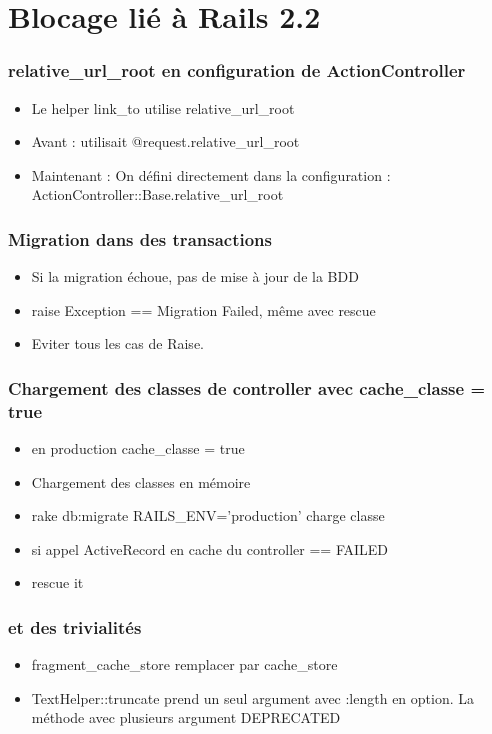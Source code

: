 \documentclass{beamer}
\begin{document}
\section{Blocage lié à Rails 2.2}

\begin{frame}
  \frametitle{relative\_url\_root en configuration de ActionController}
  \begin{itemize}
    \item Le helper link\_to utilise relative\_url\_root
    \item Avant : utilisait @request.relative\_url\_root
    \item Maintenant : On défini directement dans la configuration :
    ActionController::Base.relative\_url\_root
  \end{itemize}
\end{frame}

\begin{frame}
    \frametitle{Migration dans des transactions}
    \begin{itemize}
        \item Si la migration échoue, pas de mise à jour de la BDD
        \item raise Exception == Migration Failed, même avec rescue
        \item Eviter tous les cas de Raise.
    \end{itemize}
\end{frame}

\begin{frame}
    \frametitle{Chargement des classes de controller avec cache\_classe = true}
    \begin{itemize}
        \item en production cache\_classe = true
        \item Chargement des classes en mémoire
        \item rake db:migrate RAILS\_ENV='production' charge classe 
        \item si appel ActiveRecord en cache du controller == FAILED
        \item rescue it
    \end{itemize}
\end{frame}

\begin{frame}
  \frametitle{et des trivialités}
  \begin{itemize}
    \item fragment\_cache\_store remplacer par cache\_store
    \item TextHelper::truncate prend un seul argument avec :length en option.
    La méthode avec plusieurs argument DEPRECATED
  \end{itemize}
\end{frame}
\end{document}
